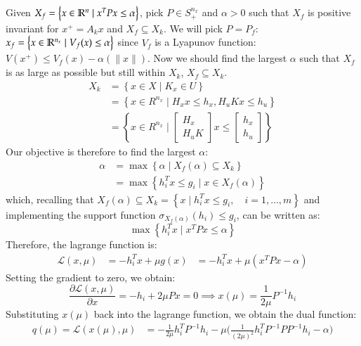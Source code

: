 \documentclass[]{article}
\begin{document}
\begin{flushleft}
	Given $ X_f = \left\{ x \in \mathbb{R}^n \mid x^T P x \le \alpha \right\} $, pick $ P \in S^{n_x}_{+} $ and $\alpha > 0$
	such that $ X_f $ is positive invariant for $ x^+ = A_k x $ and $ X_f \subseteq X_k $.
	We will pick $ P = P_f $: $ x_f = \left\{ x \in \mathbb{R}^{n_x} \mid V_f(x) \le \alpha \right\} $ since $ V_f $ is a Lyapunov function: $V(x^+) \le V_f(x) - \alpha(\| x \|) $.
	Now we should find the largest $\alpha$ such that $ X_f $ is as large as possible but still within $ X_k $, $ X_f \subseteq X_k $.
	\[
	\begin{aligned}
		X_k &= \left\{ x \in X \mid K_x \in U \right\} \\
			&= \left\{ x \in R^{n_x} \mid H_x x \le h_x, H_u K x \le h_u \right\} \\
			&= \left\{ x \in R^{n_x} \mid \begin{bmatrix}
				H_x \\
				H_u K 
			\end{bmatrix} x \le
			\begin{bmatrix}
				h_x \\
				h_u
			\end{bmatrix} \right\}
	\end{aligned} 
	\]
	Our objective is therefore to find the largest $\alpha$:
	\[ 
	\begin{aligned}
		\alpha &= \max \left\{ \alpha \mid X_f(\alpha) \subseteq X_k \right\} \\
			&= \max \left\{ h_i^T x \le g_i \mid x \in X_f(\alpha) \right\}
	\end{aligned}
	\]
	which, recalling that $ X_f(\alpha) \subseteq X_k = \left\{ x \mid h_i^T x \le g_i, \quad i = 1, \dots, m \right\} $ and implementing the support function $ \sigma_{X_f(\alpha)}(h_i) \le g_i$, can be written as:
	\[ 
		\max \left\{ h_i^T x \mid x^T P x \le \alpha \right\}
	\]
	Therefore, the lagrange function is:
	\[ 
	\begin{aligned}
		\mathcal{L}(x, \mu) &= - h_i^T x + \mu g(x)
							&= - h_i^T x + \mu (x^T P x - \alpha)
	\end{aligned}
	\]
	Setting the gradient to zero, we obtain:
	\[ 
		\frac{\partial \mathcal{L}(x, \mu)}{\partial x} = - h_i + 2 \mu P x = 0 \implies x(\mu) = \frac{1}{2 \mu} P^{-1} h_i 
	\]
	Substituting $ x(\mu) $ back into the lagrange function, we obtain the dual function:
	\[
	\begin{aligned}
		q(\mu) = \mathcal{L}(x(\mu), \mu) &= - \frac{1}{2 \mu} h_i^T P^{-1} h_i - \mu \Bigg( \frac{1}{(2 \mu)^2} h_i^T P^{-1} P P^{-1} h_i - \alpha \Bigg) \\

\end{aligned}\]
\end{flushleft}
\end{document}
